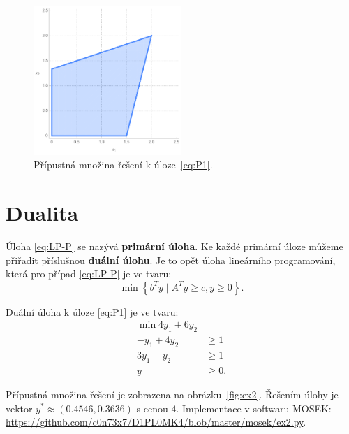\begin{figure}[h!]
    \centering
    \includegraphics[width=0.5\textwidth]{img/ex1.png}   
    \caption{Přípustná množina řešení k úloze~\ref{eq:P1}.}
    \label{fig:ex1}
\end{figure}

\section{Dualita}
Úloha \ref{eq:LP-P} se nazývá \textbf{primární úloha}. Ke každé primární úloze můžeme přiřadit příslušnou \textbf{duální úlohu}. Je to opět úloha lineárního programování, která pro případ \ref{eq:LP-P} je ve tvaru:
\begin{equation}\tag{LP-D}
    \min \left\{ b^T y \mid A^T y \geq c, y \geq 0 \right\}.
    \label{eq:LP-D}
\end{equation}

\begin{pr}
Duální úloha k úloze \ref{eq:P1} je ve tvaru:
\begin{equation}\tag{P2}
    \begin{split}
        \min 4 y_1 + 6 y_2 &    \\
        - y_1 + 4 y_2      &\geq 1 \\
        3 y_1 -   y_2      &\geq 1 \\
        y &\geq 0.
    \end{split}
    \label{eq:P2}
\end{equation}

Přípustná množina řešení je zobrazena na obrázku~\ref{fig:ex2}. Řešením úlohy je vektor $y^* \approx (0.4546, 0.3636)$ s cenou $4$. Implementace v softwaru MOSEK: \url{https://github.com/c0n73x7/D1PL0MK4/blob/master/mosek/ex2.py}.
\end{pr}


